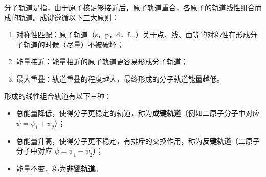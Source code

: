 
分子轨道是指，由于原子核足够接近后，原子轨道重合，各原子的轨道线性组合而成的轨道。成键遵循以下三大原则：
\begin{enumerate}
\item 对称性匹配：原子轨道（s，p，d，f...）关于点、线、面等的对称性在形成分子轨道的时候（尽量）不被破坏；
\item 能量接近：能量相近的原子轨道更容易形成分子轨道；
\item 最大重叠：轨道重叠的程度越大，最终形成的分子轨道能量越低。
\end{enumerate}

形成的线性组合轨道有以下三种：
\begin{itemize}
\item 总能量降低，使得分子更稳定的轨道，称为\textbf{成键轨道}（例如二原子分子中对应 $\psi = \psi_1 + \psi_2$）；
\item 总能量升高，使得分子更不稳定，有排斥的交换作用，称为\textbf{反键轨道}（二原子分子中对应 $\psi = \psi_1 - \psi_2$）；
\item 能量不变，称为\textbf{非键轨道}。
\end{itemize}



